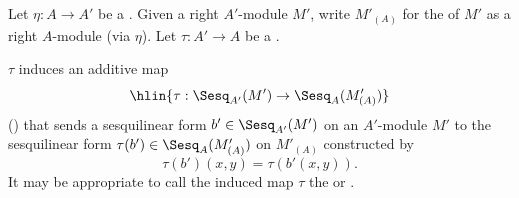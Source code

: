 \begin{definition} \label{definition:scharlau_transfer_of_sesquilinear_forms_on_modules_under_involution_ring_homomorphism}
    Let $\eta: A \to A'$ be a . 
    Given a right $A'$-module $M'$, write $M'_{(A)}$ for the  of $M'$ as a right $A$-module (via $\eta$). Let $\tau: A' \to A$ be a .

    $\tau$ induces an additive map
    $$\hlin{\tau: \Sesq_{A'}(M') \to \Sesq_A(M'_{(A)})}$$
    () that sends a sesquilinear form $b' \in \Sesq_{A'}(M')$ on an $A'$-module $M'$ to the sesquilinear form $\tau(b') \in \Sesq_A(M'_{(A)})$ on $M'_{(A)}$ constructed by
    $$\tau(b')(x,y) = \tau(b'(x,y)).$$
    It may be appropriate to call the induced map $\tau$ the  or . 
\end{definition}
